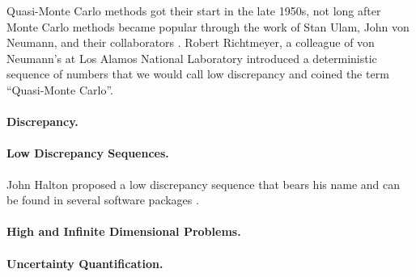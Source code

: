 Quasi-Monte Carlo methods got their start in the late 1950s, not long after Monte Carlo methods became popular through the work of Stan Ulam, John von Neumann, and their collaborators \cite{Eck87a}.  Robert Richtmeyer, a colleague of von Neumann's at Los Alamos National Laboratory introduced a deterministic sequence of numbers that we would call low discrepancy and coined the term ``Quasi-Monte Carlo''\cite{Ric51}.  

\paragraph{Discrepancy.}

\paragraph{Low Discrepancy Sequences.} John Halton proposed a low discrepancy sequence that bears his name and can be found in several software packages \cite{Hal60}.

\paragraph{High and Infinite Dimensional Problems.}

\paragraph{Uncertainty Quantification.}